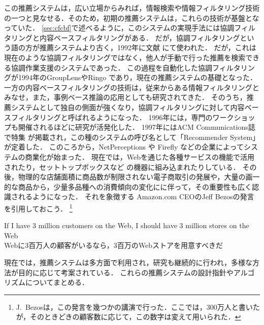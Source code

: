 この推薦システムは，広い立場からみれば，情報検索や情報フィルタリング技術の一つと見なせる．そのため，初期の推薦システムは，これらの技術が基盤となっていた．
\ref{sec:cfcbf}で述べるように，このシステムの実現手法には協調フィルタリングと内容ベースフィルタリングがある．
だが，協調フィルタリングという語の方が推薦システムより古く，1992年に文献 \cite{macm:92:01} にて使われた．
だが，これは現在のような協調フィルタリングではなく，他人が手動で行った推薦を検索できる協調作業支援のシステムであった．
この過程を自動化した協調フィルタリングが1994年のGroupLens\cite{cscw:94:01}やRingo \cite{sigchi:95:02}であり，現在の推薦システムの基礎となった．
一方の内容ベースフィルタリングの技術は，従来からある情報フィルタリングとみなせ，また，事例ベース推論の応用としても研究されてきた．
そのうち，推薦システムとして独自の側面が強くなり，協調フィルタリングに対して内容ベースフィルタリングと呼ばれるようになった．
1996年には，専門のワークショップも開催されるほどに研究が活発化した．
1997年にはACM Communications誌で特集\cite{macm:97:01} が掲載され，この種のシステムの呼び名として「Recommender System」が定着した．
このころから，NetPerceptions や Firefly などの企業によってシステムの商業化が始まった．
現在では，Webを通じた各種サービスの機能で活用されたり\cite{ieeem:99:02,ieeem:03:01,www:07:01}，セットトップボックスなど
の機器に組み込まれたり\cite{kdd:04:11}している．
その後，物理的な店舗面積に商品数が制限されない電子商取引の発展や，大量の画一的な商品から，少量多品種への消費傾向の変化にに伴って，その重要性も広く認識されるようになった．
それを象徴する Amazon.com CEOのJeff Bezosの発言を引用しておこう\cite{dmkd:01:01}．
\footnote{J.~Bezosは，この発言を幾つかの講演で行った．ここでは，300万人と書いたが，そのときどきの顧客数に応じて，この数字は変えて用いられた．} %
\begin{center}
If I have 3 million customers on the Web, I should have 3 million stores on the Web\\
Webに3百万人の顧客がいるなら，3百万のWebストアを用意すべきだ
\end{center}
現在では，推薦システムは多方面で利用され，研究も継続的に行われ，多様な方法が目的に応じて考案されている．
これらの推薦システムの設計指針やアルゴリズムについてまとめる．
